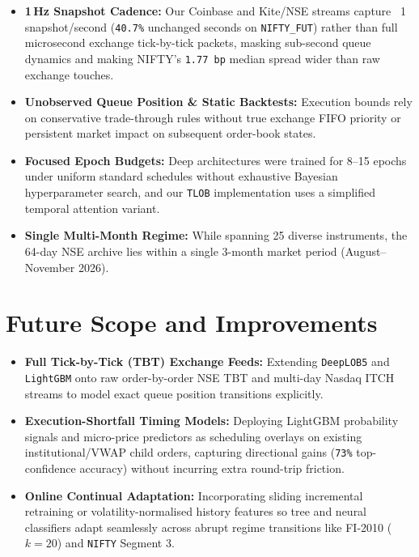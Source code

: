 \documentclass[12pt,a4paper,oneside]{report}
\newcommand{\code}[1]{\texttt{#1}}
\begin{document}
\begin{itemize}
  \item \textbf{1\,Hz Snapshot Cadence:} Our Coinbase and Kite/NSE streams capture ~1 snapshot/second (\code{40.7\%} unchanged seconds on \code{NIFTY\_FUT}) rather than full microsecond exchange tick-by-tick packets, masking sub-second queue dynamics and making NIFTY's \code{1.77 bp} median spread wider than raw exchange touches.
  \item \textbf{Unobserved Queue Position \& Static Backtests:} Execution bounds rely on conservative trade-through rules without true exchange FIFO priority or persistent market impact on subsequent order-book states.
  \item \textbf{Focused Epoch Budgets:} Deep architectures were trained for 8--15 epochs under uniform standard schedules without exhaustive Bayesian hyperparameter search, and our \code{TLOB} implementation uses a simplified temporal attention variant.
  \item \textbf{Single Multi-Month Regime:} While spanning 25 diverse instruments, the 64-day NSE archive lies within a single 3-month market period (August--November 2026).
\end{itemize}

\section{Future Scope and Improvements}

\begin{itemize}
  \item \textbf{Full Tick-by-Tick (TBT) Exchange Feeds:} Extending \code{DeepLOB5} and \code{LightGBM} onto raw order-by-order NSE TBT and multi-day Nasdaq ITCH streams to model exact queue position transitions explicitly.
  \item \textbf{Execution-Shortfall Timing Models:} Deploying LightGBM probability signals and micro-price predictors as scheduling overlays on existing institutional/VWAP child orders, capturing directional gains (\code{73\%} top-confidence accuracy) without incurring extra round-trip friction.
  \item \textbf{Online Continual Adaptation:} Incorporating sliding incremental retraining or volatility-normalised history features so tree and neural classifiers adapt seamlessly across abrupt regime transitions like FI-2010 ($k=20$) and \code{NIFTY} Segment 3.
\end{itemize}
\end{document}
